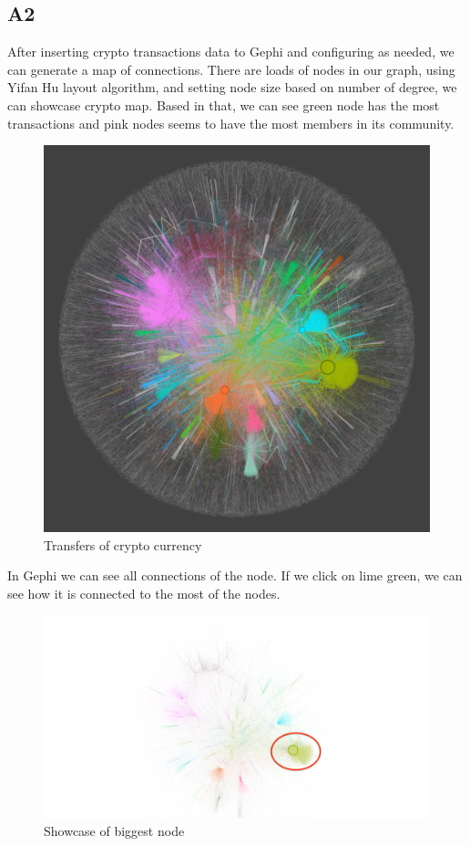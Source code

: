\subsection{A2}\label{A2}

After inserting crypto transactions data to Gephi and configuring as needed, we can generate a map of connections. There are loads of nodes in our graph, using Yifan Hu layout algorithm, and setting node size based on number of degree, we can showcase crypto map. Based in that, we can see green node has the most transactions and pink nodes seems to have the most members in its community.
\begin{figure}[H]
\includegraphics[scale=0.4]{img/A2/Figure.png}
\centering
\caption{Transfers of crypto currency}
\label{fig:Fig}
\end{figure}

In Gephi we can see all connections of the node. If we click on lime green, we can see how it is connected to the most of the nodes.
\begin{figure}[H]
\includegraphics[scale=0.4]{img/A2/Figure1.png}
\centering
\caption{Showcase of biggest node}
\label{fig:Fig1}
\end{figure}

